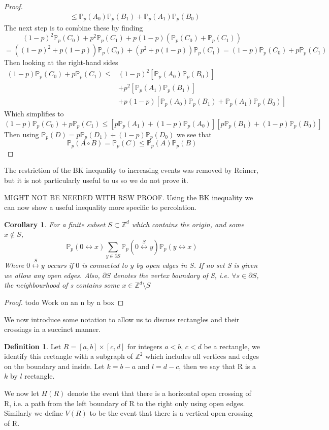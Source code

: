 \documentclass[a4paper,11pt]{article}
\newtheorem{corollary}[theorem]{Corollary}
\theoremstyle{definition}
\newtheorem{definition}[theorem]{Definition}
\newcommand{\ints}{\mathbb{Z}}
\newcommand{\prob}{\mathbb{P}_p}
\begin{document}
\begin{proof}
\begin{align*}
								&\leq \prob(A_0)\prob(B_1) + \prob(A_1)\prob(B_0)
	\end{align*}
	The next step is to combine these by finding 
	$$(1-p)^2\prob(C_0) + p^2\prob(C_1) + p(1-p)(\prob(C_0) + \prob(C_1))$$
	$$=((1-p)^2 + p(1-p))\prob(C_0) + (p^2 + p(1-p))\prob(C_1) = (1-p)\prob(C_0) + p\prob(C_1)$$
	Then looking at the right-hand sides
	\begin{align*}
		(1-p)\prob(C_0) + p\prob(C_1) \leq& (1-p)^2[\prob(A_0)\prob(B_0)]\\
		&+ p^2[\prob(A_1)\prob(B_1)]\\
		& +p(1-p)[\prob(A_0)\prob(B_1) + \prob(A_1)\prob(B_0)]
	\end{align*}
	Which simplifies to 
	$$(1-p)\prob(C_0) + p\prob(C_1) \leq [p\prob(A_1) + (1-p)\prob(A_0)][p\prob(B_1) + (1-p)\prob(B_0)]$$
	Then using $\prob(D) = p\prob(D_1) + (1-p)\prob(D_0)$ we see that
	$$\prob(A \circ B) = \prob(C) \leq \prob(A)\prob(B)$$

\end{proof}
The restriction of the BK inequality to increasing events was removed by Reimer, but it is not particularly useful to us so we do not prove it.

{\color{red} MIGHT NOT BE NEEDED WITH RSW PROOF.
Using the BK inequality we can now show a useful inequality more specific to percolation.
\begin{corollary}
	For a finite subset $S \subset \ints^d$ which contains the origin, and some $x \notin S$, 
	$$\prob(0 \longleftrightarrow x) \sum_{y\in \partial S} \prob({0\stackrel{S}{\longleftrightarrow}y})\prob(y \longleftrightarrow x)$$
	Where $0\stackrel{S}{\longleftrightarrow}y$ occurs if $0$ is connected to $y$ by open edges in $S$. If no set S is given we allow any open edges.
	Also, $\partial S$ denotes the vertex boundary of S, i.e. $\forall s \in \partial S$, the neighbourhood of s contains some $x \in \ints^d \setminus S$
\end{corollary}
\begin{proof}
	{\color{red} todo}
	Work on an n by n box
\end{proof}
}

We now introduce some notation to allow us to discuss rectangles and their crossings in a succinct manner.
\begin{definition}
	Let $R = [a,b]\times[c, d]$ for integers $a<b$, $c<d$ be a rectangle, we identify this rectangle with a subgraph of $\ints^2$ which includes all vertices and edges on the boundary and inside. Let $k = b-a$ and $l = d-c$, then we say that R is a $k$ by $l$ rectangle.
	
	We now let $H(R)$ denote the event that there is a horizontal open crossing of R, i.e. a path from the left boundary of R to the right only using open edges. Similarly we define $V(R)$ to be the event that there is a vertical open crossing of R. 
\end{definition}
\end{document}
